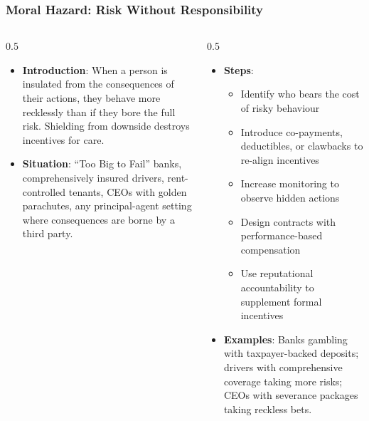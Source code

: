 \begin{frame}[fragile]\frametitle{Moral Hazard: Risk Without Responsibility}
\begin{columns}
    \begin{column}[T]{0.5\linewidth}
      \begin{itemize}
        \item \textbf{Introduction}: When a person is insulated from the consequences of their actions, they behave more recklessly than if they bore the full risk. Shielding from downside destroys incentives for care.
        \item \textbf{Situation}: ``Too Big to Fail'' banks, comprehensively insured drivers, rent-controlled tenants, CEOs with golden parachutes, any principal-agent setting where consequences are borne by a third party.
      \end{itemize}
    \end{column}
    \begin{column}[T]{0.5\linewidth}
      \begin{itemize}
        \item \textbf{Steps}:
        \begin{itemize}
          \item Identify who bears the cost of risky behaviour
          \item Introduce co-payments, deductibles, or clawbacks to re-align incentives
          \item Increase monitoring to observe hidden actions
          \item Design contracts with performance-based compensation
          \item Use reputational accountability to supplement formal incentives
        \end{itemize}\item \textbf{Examples}: Banks gambling with taxpayer-backed deposits; drivers with comprehensive coverage taking more risks; CEOs with severance packages taking reckless bets.
      \end{itemize}
    \end{column}
  \end{columns}
\end{frame}

